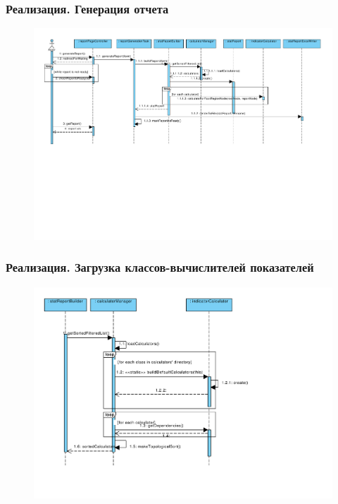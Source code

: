 \documentclass{beamer}
\begin{document}
\begin{frame}[t]
\frametitle{Реализация. Генерация отчета}
\begin{figure}
\begin{center}
\vspace{0cm}
\hspace*{-1cm} \includegraphics[scale=0.43]{../resources/uml/ReportCreation.pdf}
\end{center}
\end{figure}
\end{frame}

\begin{frame}[t]
\frametitle{Реализация. Загрузка классов-вычислителей показателей}
\begin{figure}
\begin{center}
\vspace{-1cm}
\hspace*{0.5cm} \includegraphics[scale=0.43]{../resources/uml/CalculatorLoading.pdf}
\end{center}
\end{figure}
\end{frame}
\end{document}
